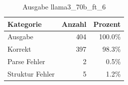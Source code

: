 
\begin{table}[!ht]
\centering
\begin{tabular}{lrr}
\toprule
\textbf{Kategorie} & \textbf{Anzahl} & \textbf{Prozent} \\
\midrule
Ausgabe & 404 & 100.0\% \\
Korrekt & 397 & 98.3\% \\
Parse Fehler & 2 & 0.5\% \\
Struktur Fehler & 5 & 1.2\% \\
\bottomrule
\end{tabular}
\caption{Ausgabe llama3_70b_ft_6}
\label{tab:file_counts}
\end{table}
    